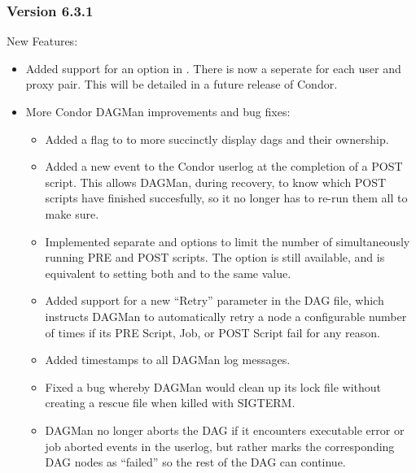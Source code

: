 \subsubsection{\label{sec:New-6-3-1}Version 6.3.1}

\noindent New Features:
\begin{itemize}

\item
Added support for an  option in
. There is now a seperate  for each
user and proxy pair. This will be detailed in a future release of
Condor.
 
\item
More Condor DAGMan improvements and bug fixes:

\begin{itemize}

\item 
Added a  flag to  to more succinctly display dags
and their ownership.

\item
Added a new event to the Condor userlog at the completion of a POST
script.  This allows DAGMan, during recovery, to know which POST
scripts have finished succesfully, so it no longer has to re-run them
all to make sure.

\item
Implemented separate  and  options to limit
the number of simultaneously running PRE and POST scripts.  The
 option is still available, and is equivalent to
setting both  and  to the same value.

\item
Added support for a new ``Retry'' parameter in the DAG file, which
instructs DAGMan to automatically retry a node a configurable number
of times if its PRE Script, Job, or POST Script fail for any reason.

\item
Added timestamps to all DAGMan log messages.

\item
Fixed a bug whereby DAGMan would clean up its lock file without
creating a rescue file when killed with SIGTERM.

\item
DAGMan no longer aborts the DAG if it encounters executable error or
job aborted events in the userlog, but rather marks the corresponding
DAG nodes as ``failed'' so the rest of the DAG can continue.


\end{itemize}
\end{itemize}
